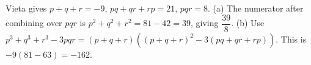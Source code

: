 Vieta gives $p+q+r=-9$, $pq+qr+rp=21$, $pqr=8$. (a) The numerator after combining over $pqr$ is $p^2+q^2+r^2=81-42=39$, giving $\boxed{\dfrac{39}{8}}$. (b) Use $p^3+q^3+r^3-3pqr=(p+q+r)((p+q+r)^2-3(pq+qr+rp))$. This is $-9(81-63)=\boxed{-162}$.
